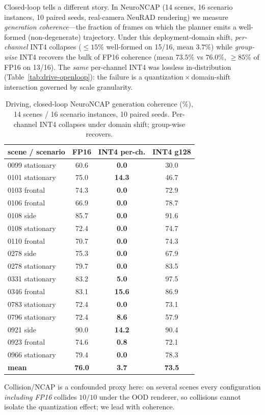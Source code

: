 \documentclass[conference]{IEEEtran}
\begin{document}
Closed-loop tells a different story. In NeuroNCAP (14 scenes, 16 scenario instances, 10 paired seeds,
real-camera NeuRAD rendering) we measure \emph{generation coherence}---the fraction of frames on which
the planner emits a well-formed (non-degenerate) trajectory. Under this deployment-domain shift,
\emph{per-channel} INT4 collapses ($\le 15\%$ well-formed on 15/16, mean $3.7\%$) while
\emph{group-wise} INT4 recovers the bulk of FP16 coherence (mean $73.5\%$ vs $76.0\%$, $\ge 85\%$ of
FP16 on 13/16). The \emph{same} per-channel INT4 was lossless in-distribution
(Table~\ref{tab:drive-openloop}): the failure is a quantization\,$\times$\,domain-shift interaction
governed by scale granularity.

\begin{table}[t]\centering
\caption{Driving, closed-loop NeuroNCAP generation coherence (\%), 14 scenes / 16 scenario instances,
10 paired seeds. Per-channel INT4 collapses under domain shift; group-wise recovers.}
\label{tab:drive-coherence}
\begin{tabular}{lccc}
\toprule
scene / scenario & FP16 & INT4 per-ch. & INT4 g128 \\
\midrule
0099 stationary & 60.6 & \textbf{0.0} & 30.0 \\
0101 stationary & 75.0 & \textbf{14.3} & 46.7 \\
0103 frontal & 74.3 & \textbf{0.0} & 72.9 \\
0106 frontal & 66.9 & \textbf{0.0} & 78.7 \\
0108 side & 85.7 & \textbf{0.0} & 91.6 \\
0108 stationary & 72.4 & \textbf{0.0} & 74.7 \\
0110 frontal & 70.7 & \textbf{0.0} & 74.3 \\
0278 side & 75.3 & \textbf{0.0} & 67.9 \\
0278 stationary & 79.7 & \textbf{0.0} & 83.5 \\
0331 stationary & 83.2 & \textbf{5.0} & 97.5 \\
0346 frontal & 83.1 & \textbf{15.6} & 86.9 \\
0783 stationary & 72.4 & \textbf{0.0} & 73.1 \\
0796 stationary & 72.4 & \textbf{8.6} & 57.9 \\
0921 side & 90.0 & \textbf{14.2} & 90.4 \\
0923 frontal & 74.6 & \textbf{0.8} & 72.1 \\
0966 stationary & 79.4 & \textbf{0.0} & 78.3 \\
\midrule
\textbf{mean} & \textbf{76.0} & \textbf{3.7} & \textbf{73.5} \\
\bottomrule
\end{tabular}
\end{table}
Collision/NCAP is a confounded proxy here: on several scenes every configuration \emph{including FP16}
collides $10/10$ under the OOD renderer, so collisions cannot isolate the quantization effect; we lead
with coherence.
\end{document}
